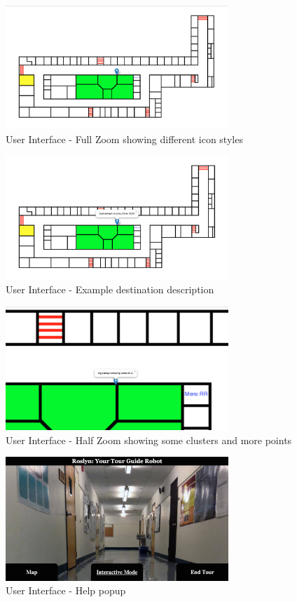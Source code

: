 \documentclass[11pt]{report}
\begin{document}
\begin{figure}[H]
 \centering
 \includegraphics[width=0.75\textwidth]{ui3.png}
 \caption{User Interface - Full Zoom showing different icon styles}
 \label{fig:ui3}
\end{figure}

\begin{figure}[H]
 \centering
 \includegraphics[width=0.75\textwidth]{ui4.png}
 \caption{User Interface - Example destination description}
 \label{fig:ui4}
\end{figure}

\begin{figure}[H]
 \centering
 \includegraphics[width=0.75\textwidth]{ui5.png}
 \caption{User Interface - Half Zoom showing some clusters and more points}
 \label{fig:ui5}
\end{figure}

\begin{figure}[H]
 \centering
 \includegraphics[width=0.75\textwidth]{ui6.png}
 \caption{User Interface - Help popup}
 \label{fig:ui6}
\end{figure}
\end{document}
